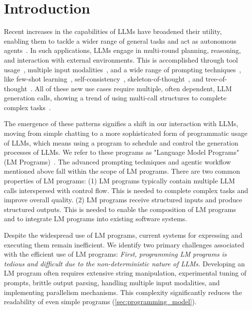 \section{Introduction}
\label{sec:intro}

Recent increases in the capabilities of LLMs have broadened their utility, enabling them to tackle a wider range of general tasks and act as autonomous agents~\cite{openai2023gpt4,bubeck2023sparks,Park2023GenerativeAgents,wang2023voyager,sumers2023cognitive}.
In such applications, LLMs engage in multi-round planning, reasoning, and interaction with external environments.
This is accomplished through tool usage~\cite{schick2023toolformer,patil2023gorilla}, multiple input modalities~\cite{team2023gemini,alayrac2022flamingo}, and a wide range of prompting techniques~\cite{liu2023prompting}, like few-shot learning~\cite{brown2020language},
self-consistency~\cite{wang2022self}, skeleton-of-thought~\cite{ning2024skeletonofthought}, and tree-of-thought~\cite{yao2023tree}.
All of these new use cases require multiple, often dependent, LLM generation calls, showing a trend of using multi-call structures to complete complex tasks~\cite{yao2022react,kim2023llm}.

The emergence of these patterns signifies a shift in our interaction with LLMs, moving from simple chatting to a more sophisticated form of programmatic usage of LLMs, which means using a program to schedule and control the generation processes of LLMs. We refer to these programs as "Language Model Programs" (LM Programs)~\cite{beurer2023lmql,khattab2023dspy}.
The advanced prompting techniques and agentic workflow mentioned above fall within the scope of LM programs.
There are two common properties of LM programs:
(1) LM programs typically contain multiple LLM calls interspersed with control flow.  This is needed to complete complex tasks and improve overall quality.
(2) LM programs receive structured inputs and produce structured outputs.  This is needed to enable the composition of LM programs and to integrate LM programs into existing software systems.

Despite the widespread use of LM programs, current systems for expressing and executing them remain inefficient. We identify two primary challenges associated with the efficient use of LM programs:
\textit{First, programming LM programs is tedious and difficult due to the non-deterministic nature of LLMs.} 
Developing an LM program often requires extensive string manipulation, experimental tuning of prompts, brittle output parsing, 
handling multiple input modalities,
and implementing parallelism mechanisms. 
This complexity significantly reduces the readability of even simple programs (\autoref{sec:programming_model}).


